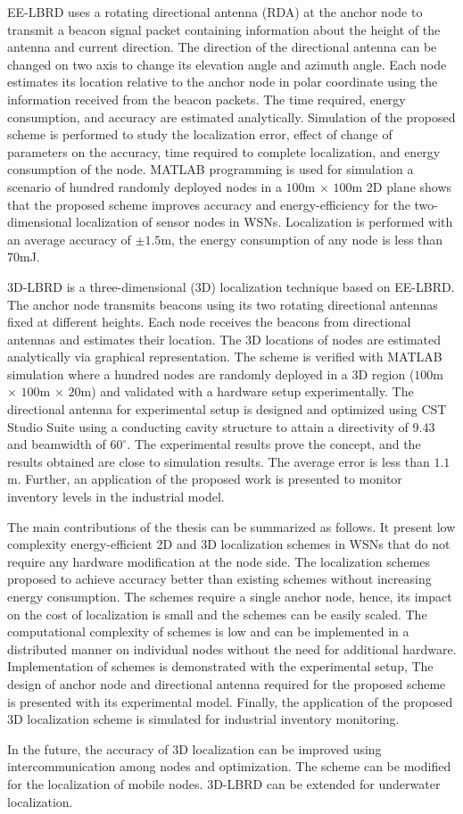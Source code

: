 \par EE-LBRD uses a rotating directional antenna (RDA) at the anchor node to transmit a beacon signal packet containing information about the height of the antenna and current direction.
The direction of the directional antenna can be changed on two axis to change its elevation angle and azimuth angle. Each node estimates its location relative to the anchor node in polar coordinate using the information received from the beacon packets. The time required, energy consumption, and accuracy are estimated analytically. Simulation of the proposed scheme is performed to study the localization error, effect of change of parameters on the accuracy, time required to complete localization, and energy consumption of the node. MATLAB programming is used for simulation a scenario of hundred randomly deployed nodes in a $100$m $\times$ $100$m 2D plane shows that the proposed scheme improves accuracy and energy-efficiency for the two-dimensional localization of sensor nodes in WSNs. Localization is performed with an average accuracy of $\pm1.5$m, the energy consumption of any node is less than 70mJ.%
\par 3D-LBRD is a three-dimensional (3D) localization technique based on EE-LBRD. The anchor node transmits beacons using its two rotating directional antennas fixed at different heights. Each node receives the beacons from directional antennas and estimates their location. The 3D locations of nodes are estimated analytically via graphical representation. The scheme is verified with MATLAB simulation where a hundred nodes are randomly deployed in a 3D region ($100$m $\times$ $100$m $\times$ $20$m) and validated with a hardware setup experimentally. The directional antenna for experimental setup is designed and optimized using CST Studio Suite using a conducting cavity structure to attain a directivity of 9.43 and beamwidth of $60^\circ$. The experimental results prove the concept, and the results obtained are close to simulation results. The average error is less than $1.1$m. Further, an application of the proposed work is presented to monitor inventory levels in the industrial model.%
\par The main contributions of the thesis can be summarized as follows. It present low complexity energy-efficient 2D and 3D localization schemes in WSNs that do not require any hardware modification at the node side. The localization schemes proposed to achieve accuracy better than existing schemes without increasing energy consumption. The schemes require a single anchor node, hence, its impact on the cost of localization is small and the schemes can be easily scaled. The computational complexity of schemes is low and can be implemented in a distributed manner on individual nodes without the need for additional hardware. Implementation of schemes is demonstrated with the experimental setup, The design of anchor node and directional antenna required for the proposed scheme is presented with its experimental model. Finally, the application of the proposed 3D localization scheme is simulated for industrial inventory monitoring.
\par In the future, the accuracy of 3D localization can be improved using intercommunication among nodes and optimization. The scheme can be modified for the localization of mobile nodes. 3D-LBRD can be extended for underwater localization.



